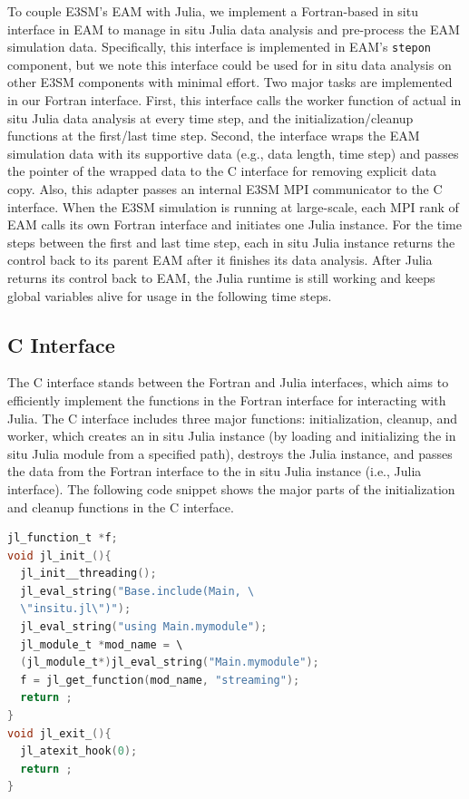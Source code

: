 \documentclass{juliacon}
\begin{document}
To couple E3SM's EAM with Julia, we implement a Fortran-based in situ interface in EAM to manage in situ Julia data analysis and pre-process the EAM simulation data. Specifically, this interface is implemented in EAM's \texttt{stepon} component, but we note this interface could be used for in situ data analysis on other E3SM components with minimal effort. Two major tasks are implemented in our Fortran interface. First, this interface calls the worker function of actual in situ Julia data analysis at every time step, and the initialization/cleanup functions at the first/last time step. Second, the interface wraps the EAM simulation data with its supportive data (e.g., data length, time step) and passes the pointer of the wrapped data to the C interface for removing explicit data copy. Also, this adapter passes an internal E3SM MPI communicator to the C interface. When the E3SM simulation is running at large-scale, each MPI rank of EAM calls its own Fortran interface and initiates one Julia instance. For the time steps between the first and last time step, each in situ Julia instance returns the control back to its parent EAM after it finishes its data analysis. After Julia returns its control back to EAM, the Julia runtime is still working and keeps global variables alive for usage in the following time steps.



\subsection{C Interface}


The C interface stands between the Fortran and Julia interfaces, which aims to efficiently implement the functions in the Fortran interface for interacting with Julia. The C interface includes three major functions: initialization, cleanup, and worker, which creates an in situ Julia instance (by loading and initializing the in situ Julia module from a specified path), destroys the Julia instance, and passes the data from the Fortran interface to the in situ Julia instance (i.e., Julia interface). The following code snippet shows the major parts of the initialization and cleanup functions in the C interface.

\begin{minipage}{\linewidth}
\begin{lstlisting}[language = C, caption={C interface initialization and cleanup.}]
jl_function_t *f;
void jl_init_(){
  jl_init__threading();
  jl_eval_string("Base.include(Main, \
  \"insitu.jl\")");
  jl_eval_string("using Main.mymodule");
  jl_module_t *mod_name = \
  (jl_module_t*)jl_eval_string("Main.mymodule");
  f = jl_get_function(mod_name, "streaming");
  return ;
}
void jl_exit_(){
  jl_atexit_hook(0);
  return ;
}
\end{lstlisting}
\end{minipage}
\end{document}
